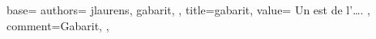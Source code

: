 {
  base={
    authors={
      jlaurens,
      gabarit,
    },
    title=gabarit,
    value={
      Un  est  de l'….
    },
    comment={Gabarit},
  },
}
